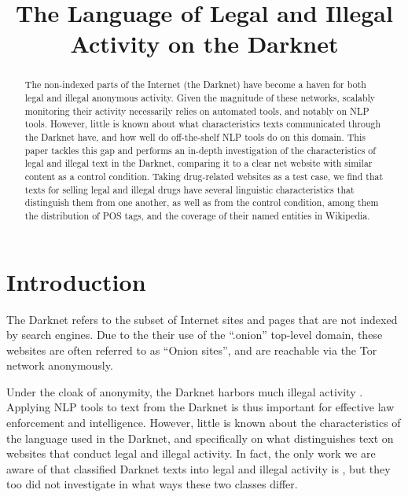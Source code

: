 \documentclass[11pt,a4paper,table]{article}
\title{The Language of Legal and Illegal Activity on the Darknet}
\date{}
\begin{document}
\maketitle

\begin{abstract}
  The non-indexed parts of the Internet (the Darknet)
   have become a haven for both legal and illegal anonymous activity.
  Given the magnitude of these networks, scalably monitoring their activity necessarily relies
    on automated tools, and notably on NLP tools.
  However, little is known about what characteristics texts communicated through the Darknet have, 
    and how well do off-the-shelf NLP tools do on this domain.
  This paper tackles this gap and performs an in-depth investigation of the characteristics
    of legal and illegal text in the Darknet, comparing it to a clear net website with similar
    content as a control condition.
  Taking drug-related websites as a test case, we find that texts for selling legal and illegal drugs
    have several linguistic characteristics that distinguish them from one another, as well as from 
    the control condition, among them the distribution of POS tags, and the coverage of their named entities in Wikipedia.
\end{abstract}



\section{Introduction}



  The Darknet refers to the subset of Internet sites and pages that are not
  indexed by search engines.
  Due to the their use of the ``.onion'' top-level domain, these websites are
  often referred to as ``Onion sites'', and are reachable via the Tor network
  anonymously.
  
  Under the cloak of anonymity, the Darknet harbors much illegal activity \citep{moore2016cryptopolitik}.
  Applying NLP tools to text from the Darknet is thus important for effective law enforcement and intelligence.
  However, little is known about the characteristics of the language used in the Darknet, 
  and specifically on what distinguishes text on websites that conduct legal and illegal activity.
	In fact, the only work we are aware of that classified Darknet texts into legal and illegal activity is \citet{Avarikioti18},
	but they too did not investigate in what ways these two classes differ.
  
\end{document}
